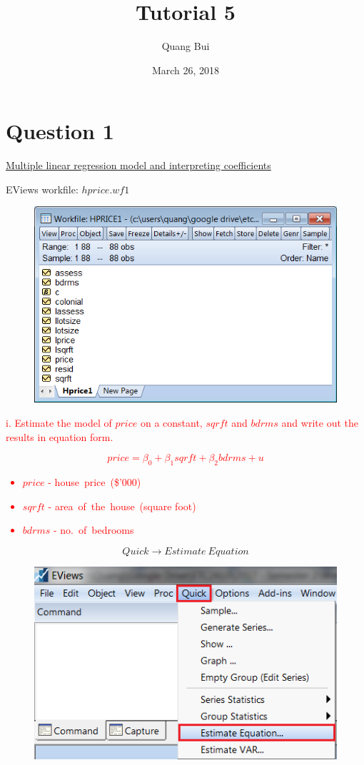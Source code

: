 \documentclass[12pt]{report}
\title{Tutorial 5}
\subtitle
{
\textbf{keywords}: OLS estimator, multiple linear regression, interpretation, ceteris paribus, predict, interpretation, variation, R squared

\textbf{estimated reading time}: 30 minutes
}
\author{Quang Bui}
\date{March 26, 2018}
\begin{document}
\maketitle

\newpage
\section*{Question 1}
\underline{Multiple linear regression model and interpreting coefficients}

\noindent EViews workfile: $hprice.wf1$
\begin{figure}[H]
	\centering
	\includegraphics{q5_1}
\end{figure}
\vspace{-\baselineskip}
\noindent \textcolor{red}
{
	i. Estimate the model of $price$ on a constant, $sqrft$ and $bdrms$ and write out the results in equation form.
}
\noindent \textcolor{red}{$$price = \beta_0 + \beta_1sqrft + \beta_2bdrms + u$$ \begin{itemize}
		\item $price$ - house\ price\ (\$'000)
		\item $sqrft$ - area\ of\ the\ house\ (square foot)
		\item $bdrms$ - no.\ of\ bedrooms
\end{itemize}} \vspace{-\baselineskip}
$$Quick \to Estimate\ Equation$$
\begin{figure}[H]
	\centering
	\includegraphics{q1_2}
\end{figure}
\end{document}
